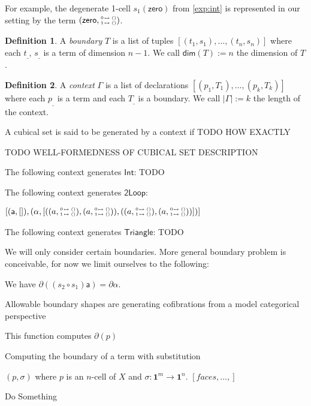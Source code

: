 \documentclass[11pt]{article}
\theoremstyle{definition}
\newtheorem{definition}{Definition}
\newcommand{\continuation}{??}
\newenvironment{examplecontd}[1]
{\renewcommand{\continuation}{\ref{#1}}\expcont[continued]}
{\endexpcont}
\newcommand{\mdef}{:=}
\newcommand{\mname}[1]{\textit{{#1}}}
\newcommand{\pint}[1]{\mathbf{1}^{#1}}
\renewcommand{\dim}[1]{\mathsf{dim}({#1})}
\newcommand{\ctxtdim}[1]{|{#1}|}
\newcommand{\smap}[1]{s_{{#1}}}
\newcommand{\cset}[1]{\mathsf{{#1}}}
\newcommand{\boundary}[1]{\partial({#1})}
\newcommand{\substtwo}[2]{\tiny
  \arraycolsep=.4pt\def\arraystretch{1}
  \begin{array}{ll}
    0 &\mapsto {#1} \\
    1 &\mapsto {#2}
  \end{array}
}
\newcommand{\constzero}{\substtwo{()}{()}}
\begin{document}
For example, the degenerate 1-cell $\smap{1}(\cset{zero})$ from \autoref{exp:int}
is represented in our setting by the term $(\cset{zero}, \constzero)$.

\begin{definition}
  A \mname{boundary} $T$ is a list of tuples $[(t_1,s_1) , \ldots , (t_n,s_n)]$
  where each $t_\_$, $s_\_$ is a term of dimension $n-1$. We call $\dim{T} \mdef n$ the dimension of $T$.
\end{definition}

\begin{definition}
  A \mname{context} $\Gamma$ is a list of declarations $[ (p_1,T_1) , \ldots , (p_k,T_k)]$
  where each $p_\_$ is a term and each $T_\_$ is a boundary. We call
  $\ctxtdim{\Gamma} \mdef k$ the length of the context.
\end{definition}

A cubical set is said to be generated by a context if TODO HOW EXACTLY

TODO WELL-FORMEDNESS OF CUBICAL SET DESCRIPTION

\begin{examplecontd}{exp:int}
  The following context generates $\cset{Int}$: TODO
\end{examplecontd}

\begin{examplecontd}{exp:loopspace}
  The following context generates $\cset{2Loop}$:

  $[ (\cset{a},[]) , (\cset{\alpha} , [ ((a, \constzero) , (a, \constzero)) ,
  ((a, \constzero), (a, \constzero)) ])]$
  
\end{examplecontd}

\begin{examplecontd}{exp:triangle}
  The following context generates $\cset{Triangle}$: TODO 
\end{examplecontd}


We will only consider certain boundaries. More general boundary problem is
conceivable, for now we limit ourselves to the following:

We have $\partial ((\smap{2} \circ \smap{1}) \cset{a}) = \partial{\cset{\alpha}}$.


Allowable boundary shapes are generating cofibrations from a model categorical perspective

This function computes $\boundary{p}$

\begin{algorithm}[H]
  \caption{Computing the boundary of a term with substitution}\label{alg:boundary}
  \begin{algorithmic}
    \Require $(p, \sigma)$ where $p$ is an $n$-cell of $X$ and $\sigma : \pint{m} \to \pint{n}$.
    \Ensure $[faces , ... , ]$
    
    \State Do Something
    \EndProcedure

  \end{algorithmic}
\end{algorithm}
\end{document}
